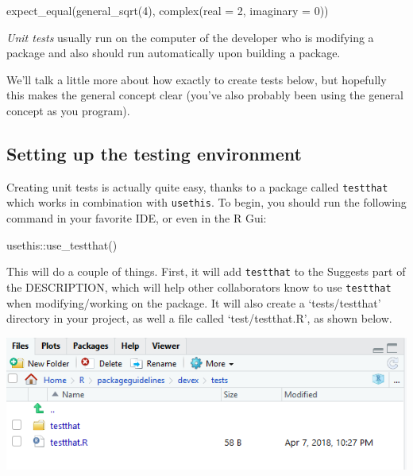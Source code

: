 \documentclass[
]{book}
\newenvironment{Shaded}{\begin{snugshade}}{\end{snugshade}}
\newcommand{\AttributeTok}[1]{\textcolor[rgb]{0.77,0.63,0.00}{#1}}
\newcommand{\DecValTok}[1]{\textcolor[rgb]{0.00,0.00,0.81}{#1}}
\newcommand{\FunctionTok}[1]{\textcolor[rgb]{0.00,0.00,0.00}{#1}}
\newcommand{\NormalTok}[1]{#1}
\newcommand{\SpecialCharTok}[1]{\textcolor[rgb]{0.00,0.00,0.00}{#1}}
\begin{document}
\begin{Shaded}
\begin{Highlighting}[]
\FunctionTok{expect\_equal}\NormalTok{(}\FunctionTok{general\_sqrt}\NormalTok{(}\DecValTok{4}\NormalTok{), }\FunctionTok{complex}\NormalTok{(}\AttributeTok{real =} \DecValTok{2}\NormalTok{, }\AttributeTok{imaginary =} \DecValTok{0}\NormalTok{))}
\end{Highlighting}
\end{Shaded}

\emph{Unit tests} usually run on the computer of the developer who is modifying a package and also should run automatically upon building a package.

We'll talk a little more about how exactly to create tests below, but hopefully this makes the general concept clear (you've also probably been using the general concept as you program).

\hypertarget{setting-up-the-testing-environment}{%
\subsection{Setting up the testing environment}\label{setting-up-the-testing-environment}}

Creating unit tests is actually quite easy, thanks to a package called \texttt{testthat} which works in combination with \texttt{usethis}. To begin, you should run the following command in your favorite IDE, or even in the R Gui:

\begin{Shaded}
\begin{Highlighting}[]
\NormalTok{usethis}\SpecialCharTok{::}\FunctionTok{use\_testthat}\NormalTok{()}
\end{Highlighting}
\end{Shaded}

This will do a couple of things. First, it will add \texttt{testthat} to the Suggests part of the DESCRIPTION, which will help other collaborators know to use \texttt{testthat} when modifying/working on the package. It will also create a `tests/testthat' directory in your project, as well a file called `test/testthat.R', as shown below.

\includegraphics{images/testSS/devtoolstestthat.PNG}
\end{document}

